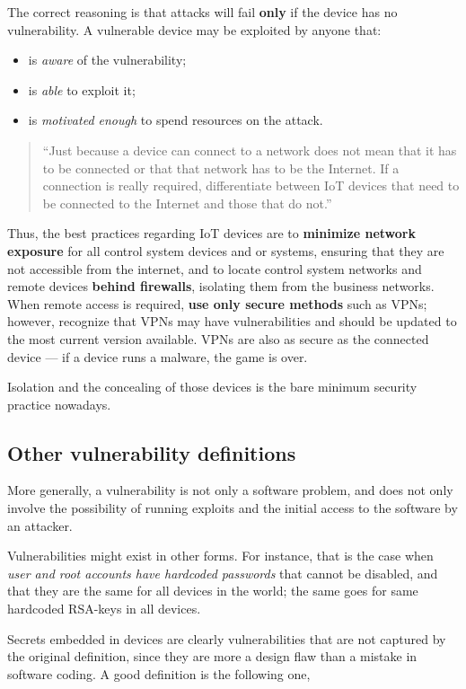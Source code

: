 \documentclass[10pt]{\classname}
\begin{document}
The correct reasoning is that attacks will fail \textbf{only} if the device has
no vulnerability. A vulnerable device may be exploited by anyone that:
\begin{itemize}
    \item is \emph{aware} of the vulnerability;
    \item is \emph{able} to exploit it;
    \item is \emph{motivated enough} to spend resources on the attack.
\end{itemize}

\begin{quote}
``Just because a device can connect to a network does not mean that it has to be
connected or that that network has to be the Internet. If a connection is
really required, differentiate between IoT devices that need to be connected to
the Internet and those that do not.''
\end{quote}

Thus, the best practices regarding IoT devices are to \textbf{minimize network
exposure} for all control system devices and or systems, ensuring that they are
not accessible from the internet, and to locate control system networks and
remote devices \textbf{behind firewalls}, isolating them from the business
networks. When remote access is required, \textbf{use only secure methods} such
as VPNs; however, recognize that VPNs may have vulnerabilities and should be
updated to the most current version available. VPNs are also as secure as the
connected device --- if a device runs a malware, the game is over.

Isolation and the concealing of those devices is the bare minimum security
practice nowadays.


\subsection{Other vulnerability definitions}

More generally, a vulnerability is not only a software problem, and does not
only involve the possibility of running exploits and the initial access to the
software by an attacker.

Vulnerabilities might exist in other forms. For instance, that is the case when
\emph{user and root accounts have hardcoded passwords} that cannot be disabled,
and that they are the same for all devices in the world; the same goes for same
hardcoded RSA-keys in all devices.

Secrets embedded in devices are clearly vulnerabilities that are not captured
by the original definition, since they are more a design flaw than a mistake in
software coding. A good definition is the following one,
\end{document}
